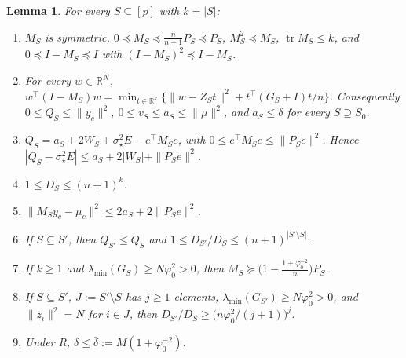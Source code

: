 \documentclass[11pt]{article}
\newtheorem{lemma}[theorem]{Lemma}
\theoremstyle{remark}
\newcommand{\R}{\mathbb R}
\newcommand{\tr}{\operatorname{tr}}
\newcommand{\sst}{\sigma_\star}
\begin{document}
\begin{lemma}\label{lem:alg}
For every $S\subseteq[p]$ with $k=|S|$:
\begin{enumerate}[label=(\alph*)]
\item $M_S$ is symmetric, $0\preceq M_S\preceq\frac{n}{n+1}P_S\preceq P_S$, $M_S^2\preceq M_S$, $\tr M_S\le k$, and $0\preceq I-M_S\preceq I$ with $(I-M_S)^2\preceq I-M_S$.
\item For every $w\in\R^N$, $w^\top(I-M_S)w=\min_{t\in\R^k}\{\|w-Z_St\|^2+t^\top(G_S+I)t/n\}$. Consequently $0\le Q_S\le\|y_c\|^2$, $0\le v_S\le a_S\le\|\mu\|^2$, and $a_{S}\le\delta$ for every $S\supseteq S_0$.
\item $Q_S=a_S+2W_S+\sst^2E-e^\top M_Se$, with $0\le e^\top M_Se\le\|P_Se\|^2$. Hence $|Q_S-\sst^2E|\le a_S+2|W_S|+\|P_Se\|^2$.
\item $1\le D_S\le(n+1)^k$.
\item $\|M_Sy_c-\mu_c\|^2\le2a_S+2\|P_Se\|^2$.
\item If $S\subseteq S'$, then $Q_{S'}\le Q_S$ and $1\le D_{S'}/D_S\le(n+1)^{|S'\setminus S|}$.
\item If $k\ge1$ and $\lambda_{\min}(G_S)\ge N\varphi_0^2>0$, then $M_S\succeq\big(1-\frac{1+\varphi_0^{-2}}{n}\big)P_S$.
\item If $S\subseteq S'$, $J:=S'\setminus S$ has $j\ge1$ elements, $\lambda_{\min}(G_{S'})\ge N\varphi_0^2>0$, and $\|z_i\|^2=N$ for $i\in J$, then $D_{S'}/D_S\ge\big(n\varphi_0^2/(j+1)\big)^j$.
\item Under R, $\delta\le\bar\delta:=M(1+\varphi_0^{-2})$.
\end{enumerate}
\end{lemma}
\end{document}
